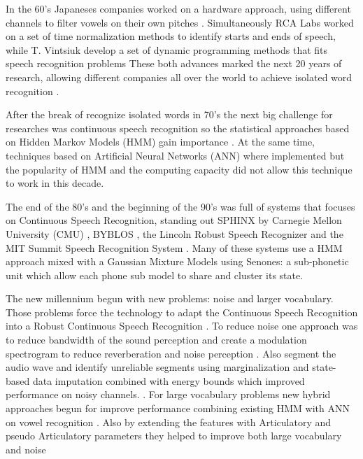 In the 60's Japaneses companies worked on a hardware approach, using different channels to filter vowels on their own pitches \cite{Sakai1961TheMechanism,Nagata1964SpokenLanguage}. Simultaneously RCA Labs worked on a set of time normalization methods to identify starts and ends of speech\cite{Martin1964SPEECHTECHNIQUES.}, while T. Vintsiuk develop a set of dynamic programming methods that fits speech recognition problems \cite{Vintsyuk1972SpeechProgramming} These both advances marked the next 20 years of research, allowing different companies all over the world to achieve isolated word recognition \cite{Velichko1970AutomaticWords,Sakoe1978DynamicRecognition,Itakura1975MinimumRecognition}.

After the break of recognize isolated words in 70's the next big challenge for researches was continuous speech recognition so the statistical approaches based on Hidden Markov Models (HMM) gain importance \cite{RabinerARecognition}. At the same time, techniques based on Artificial Neural Networks (ANN) where implemented \cite{Waibel1989PhonemeNetworks}  but the popularity of HMM and the computing capacity did not allow this technique to work in this decade.

The end of the 80's and the beginning of the 90's was full of systems that focuses on Continuous Speech Recognition, standing out SPHINX by Carnegie Mellon University (CMU) \cite{Lee1990AnSystem}, BYBLOS \cite{ChowBYBLOS:System}, the Lincoln Robust Speech Recognizer \cite{PaulTheRecognizer} and the MIT Summit Speech Recognition System \cite{Zue1989TheReport}. Many of these systems use a HMM approach mixed with a Gaussian Mixture Models using Senones: a sub-phonetic unit which allow each phone sub model to share and cluster its state\cite{HwangSubphoneticRecognition}.

The new millennium begun with new problems: noise and larger vocabulary. Those problems force the technology to adapt the Continuous Speech Recognition into a Robust Continuous Speech Recognition \cite{SieglerOnSystems,MirghaforiTowardsASR}.  To reduce noise one approach was to reduce bandwidth of the sound perception and create a modulation spectrogram to reduce reverberation and noise perception \cite{Kingsbury1998RobustSpectrogram}. Also segment the audio wave and identify unreliable segments using marginalization and state-based data imputation combined with energy bounds which improved performance on noisy channels. \cite{Cooke2001RobustData}. For large vocabulary problems new hybrid approaches begun for improve performance combining existing HMM with ANN on vowel recognition \cite{BourlardABands}. Also by extending the features with Articulatory and pseudo Articulatory parameters they helped to improve both large vocabulary and noise \cite{Kirchhoff2002CombiningRecognition}

